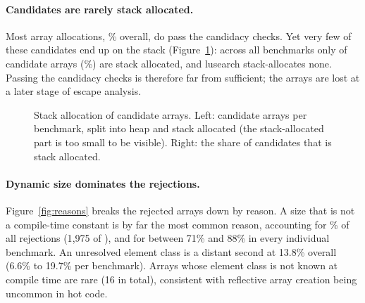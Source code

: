 \paragraph{Candidates are rarely stack allocated.} Most array allocations, \CandRate\% overall,
do pass the candidacy checks. Yet very few of these candidates end up on the stack
(Figure~\ref{fig:stackarrays}): across all benchmarks only \StackCount{} of \CandCount{}
candidate arrays (\StackRateOfCand\%) are stack allocated, and lusearch stack-allocates none.
Passing the candidacy checks is therefore far from sufficient; the arrays are lost at a later
stage of escape analysis.

\begin{figure}[htbp]
  \centering
  \caption{Stack allocation of candidate arrays. Left: candidate arrays per benchmark, split into
           heap and stack allocated (the stack-allocated part is too small to be visible). Right:
           the share of candidates that is stack allocated.}
  \label{fig:stackarrays}
\end{figure}

\paragraph{Dynamic size dominates the rejections.} Figure~\ref{fig:reasons} breaks the rejected
arrays down by reason. A size that is not a compile-time constant is by far the most common
reason, accounting for \TopReasonShare\% of all rejections (1{,}975 of \FailedCount{}), and for
between 71\% and 88\% in every individual benchmark. An unresolved element class is a distant
second at 13.8\% overall (6.6\% to 19.7\% per benchmark). Arrays whose element class is not
known at compile time are rare (16 in total), consistent with reflective array creation being
uncommon in hot code.

